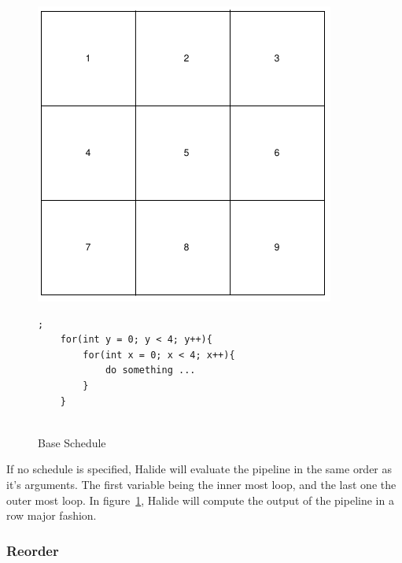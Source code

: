 \begin{figure}[h]
		\begin{minipage}[c]{\EIW}
			\centering
		\includegraphics[width=\textwidth]{Images/BaseOrder.png}
		\end{minipage}
		\begin{minipage}[c]{\ECW}
			\centering
			\begin{lstlisting}[label={code:reorder}];
	for(int y = 0; y < 4; y++){
		for(int x = 0; x < 4; x++){
			do something ...
		}
	}
	
\end{lstlisting}
		\end{minipage}
	\caption{Base Schedule}
	\label{schedule:default}
\end{figure}



	If no schedule is specified, Halide will evaluate the pipeline in the same order as it's arguments. The first variable being the inner most loop, and the last one the outer most loop. In figure~\ref{schedule:default}, Halide will compute the output of the pipeline in a row major fashion.

	\subsubsection{Reorder}

